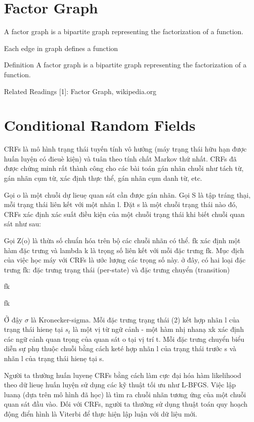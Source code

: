 \section{Factor Graph}

A factor graph is a bipartite graph representing the factorization of a function.

Each edge in graph defines a function

Definition
A factor graph is a bipartite graph representing the factorization of a function.

Related Readings
[1]: Factor Graph, wikipedia.org

\section{Conditional Random Fields}

CRFs là mô hình trạng thái tuyến tính vô hướng (máy trạng thái hữu hạn được huấn luyện có đieuè kiện) và tuân theo tính chất Markov thứ nhất. CRFs đã được chứng minh rất thành công cho các bài toán gán nhãn chuỗi như tách từ, gán nhãn cụm từ, xác định thực thể, gán nhãn cụm danh từ, etc.

Gọi o là một chuỗi dự lieuẹ quan sát cần được gán nhãn. Gọi S là tập tráng thại, mỗi trạng thái liên kết với một nhãn l. Đặt s là một chuỗi trạng thái nào đó, CRFs xác định xác suất điều kiện của một chuỗi trạng thái khi biết chuỗi quan sát như sau:

Gọi Z(o) là thừa số chuẩn hóa trên bộ các chuỗi nhãn có thể. fk xác định một hàm đặc trưng và lambda k là trọng số liên kết với mỗi đặc trưng fk. Mục địch của việc học máy với CRFs là ước lượng các trọng số này. ở đây, có hai loại đặc trưng fk: đặc trưng trạng thái (per-state) và đặc trưng chuyển (transition)

fk

fk

Ở đậy $\sigma$ là Kronecker-sigma. Mỗi đặc trưng trạng thái (2) kết hợp nhãn l của trạng thái hienẹ tại $s_t$ là một vị từ ngữ cảnh - một hàm nhị nhanạ xk xác định các ngữ cảnh quan trọng của quan sát o tại vị trí t. Mỗi đặc trưng chuyển biểu diễn sự phụ thuộc chuỗi bằng cách keté hợp nhãn l của trạng thái trước s và nhãn l của trạng thái hienẹ tại s.

Người ta thường huấn luyenẹ CRFs bằng cách làm cực đại hóa hàm likelihood theo dữ lieuẹ huấn luyện sử dụng các kỹ thuật tối ưu như L-BFGS. Việc lập luanạ (dựa trên mô hình đã học) là tìm ra chuỗi nhãn tương ứng của một chuỗi quan sát đầu vào. Đối với CRFs, người ta thường sử dụng thuật toán quy hoạch động điển hình là Viterbi để thực hiện lập luận với dữ liệu mới.

